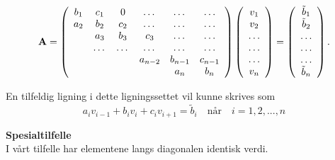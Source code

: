 \documentclass{article}
\begin{document}
\begin{equation}
    {\bf A} = \left(\begin{array}{cccccc}
                           b_1& c_1 & 0 &\dots   & \dots &\dots \\
                           a_2 & b_2 & c_2 &\dots &\dots &\dots \\
                           & a_3 & b_3 & c_3 & \dots & \dots \\
                           & \dots   & \dots &\dots   &\dots & \dots \\
                           &   &  &a_{n-2}  &b_{n-1}& c_{n-1} \\
                           &    &  &   &a_n & b_n \\
                      \end{array} \right)\left(\begin{array}{c}
                           v_1\\
                           v_2\\
                           \dots \\
                          \dots  \\
                          \dots \\
                           v_n\\
                      \end{array} \right)
  =\left(\begin{array}{c}
                           \tilde{b}_1\\
                           \tilde{b}_2\\
                           \dots \\
                           \dots \\
                          \dots \\
                           \tilde{b}_n\\
                      \end{array} \right).
\end{equation}

En tilfeldig ligning i dette ligningssettet vil kunne skrives som
\begin{equation}
a_iv_{i-1} + b_iv_i + c_iv_{i+1} = \tilde{b}_i \quad \textrm{når} \quad i = 1,2,...,n
\end{equation}





\textbf{Spesialtilfelle}\\
I vårt tilfelle har elementene langs diagonalen identisk verdi.
\end{document}
